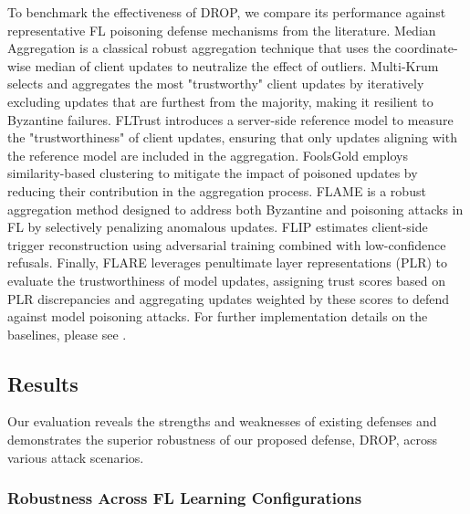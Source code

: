  To benchmark the effectiveness of DROP, we compare its performance against representative FL poisoning defense mechanisms from the literature. Median Aggregation \citep{yin2018byzantine} is a classical robust aggregation technique that uses the coordinate-wise median of client updates to neutralize the effect of outliers. Multi-Krum \citep{blanchard2017machine} selects and aggregates the most "trustworthy" client updates by iteratively excluding updates that are furthest from the majority, making it resilient to Byzantine failures. FLTrust \citep{cao2021fltrust} introduces a server-side reference model to measure the "trustworthiness" of client updates, ensuring that only updates aligning with the reference model are included in the aggregation. FoolsGold \citep{fung2018mitigating} employs similarity-based clustering to mitigate the impact of poisoned updates by reducing their contribution in the aggregation process. FLAME \citep{nguyen2022flame} is a robust aggregation method designed to address both Byzantine and poisoning attacks in FL by selectively penalizing anomalous updates. FLIP \citep{zhang2023flip} estimates client-side trigger reconstruction using adversarial training combined with low-confidence refusals. Finally, FLARE \citep{wang2022flare} leverages penultimate layer representations (PLR) to evaluate the trustworthiness of model updates, assigning trust scores based on PLR discrepancies and aggregating updates weighted by these scores to defend against model poisoning attacks.
%
For further implementation details on the baselines, please see .

\subsection{Results}
\label{sec:results}
Our evaluation reveals the strengths and weaknesses of existing defenses and demonstrates the superior robustness of our proposed defense, DROP, across various attack scenarios.

\subsubsection{Robustness Across FL Learning Configurations}

